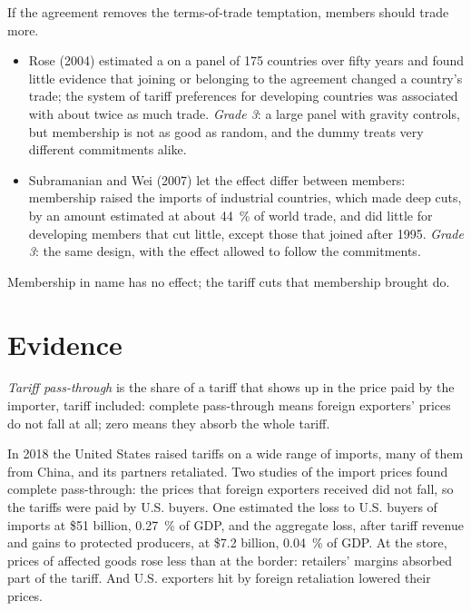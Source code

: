 \begin{debate}
If the agreement removes the terms-of-trade temptation, members should trade more.
\begin{itemize}
\item Rose (2004) estimated a  on a panel of 175 countries over
fifty years and found little evidence that joining or belonging to the agreement
changed a country's trade; the system of tariff preferences for developing
countries was associated with about twice as much trade. %
\emph{Grade 3}: a large panel with gravity controls, but membership is not as good as
random, and the dummy treats very different commitments alike.
\item Subramanian and Wei (2007) let the effect differ between members: membership
raised the imports of industrial countries, which made deep cuts, by an amount
estimated at about 44~\% of world trade, and did little for developing members
that cut little, except those that joined after 1995. %
\emph{Grade 3}: the same design, with the effect allowed to follow the commitments.
\end{itemize}
Membership in name has no effect; the tariff cuts that membership brought do.
\end{debate}

\section{Evidence}\label{sec:b3:trade-policy:evidence}

\begin{definition}\label{def:b3:trade-policy:pass-through}
\emph{Tariff pass-through} is the share of a tariff that shows up in the price paid
by the importer, tariff included: complete pass-through means foreign exporters'
prices do not fall at all; zero means they absorb the whole tariff.
\end{definition}

\begin{record}
In 2018 the United States raised tariffs on a wide range of imports, many of them
from China, and its partners retaliated. Two studies of the import prices found
complete pass-through: the prices that foreign exporters received did not fall,
so the tariffs were paid by U.S. buyers. %
One estimated the loss to U.S. buyers of imports at \$51 billion, 0.27~\% of GDP,
and the aggregate loss, after tariff revenue and gains to protected producers, at
\$7.2 billion, 0.04~\% of GDP. %
At the store, prices of affected goods rose less than at the border: retailers'
margins absorbed part of the tariff. And U.S. exporters hit by foreign retaliation
lowered their prices. %
\end{record}


